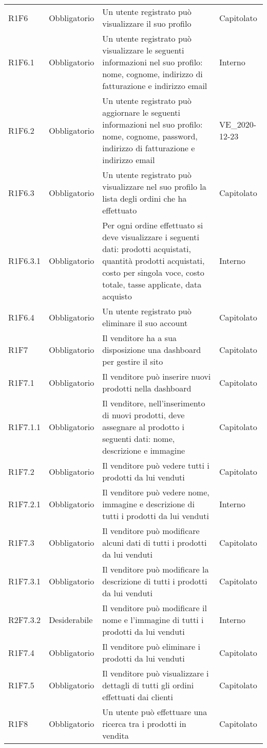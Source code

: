 {\begin{longtable}{C{2.5cm} C{2.8cm} C{6.7cm} C{2.5cm}}
R1F6 & Obbligatorio & Un utente registrato può visualizzare il suo profilo & Capitolato \\
R1F6.1 & Obbligatorio & Un utente registrato può visualizzare le seguenti informazioni nel suo profilo: nome, cognome, indirizzo di fatturazione e indirizzo email & Interno \\
R1F6.2 & Obbligatorio & Un utente registrato può aggiornare le seguenti informazioni nel suo profilo: nome, cognome, password, indirizzo di fatturazione e indirizzo email & VE\_2020-12-23 \\
R1F6.3 & Obbligatorio & Un utente registrato può visualizzare nel suo profilo la lista degli ordini che ha effettuato & Capitolato \\
R1F6.3.1 & Obbligatorio & Per ogni ordine effettuato si deve visualizzare i seguenti dati: prodotti acquistati, quantità prodotti acquistati, costo per singola voce, costo totale, tasse applicate, data acquisto & Interno \\
R1F6.4 & Obbligatorio & Un utente registrato può eliminare il suo account & Capitolato \\


R1F7 & Obbligatorio & Il venditore ha a sua disposizione una dashboard per gestire il sito & Capitolato \\
R1F7.1 & Obbligatorio & Il venditore può inserire nuovi prodotti nella dashboard & Capitolato \\
R1F7.1.1 & Obbligatorio & Il venditore, nell'inserimento di nuovi prodotti, deve assegnare al prodotto i seguenti dati: nome, descrizione e immagine & Capitolato \\
R1F7.2 & Obbligatorio & Il venditore può vedere tutti i prodotti da lui venduti & Capitolato \\
R1F7.2.1 & Obbligatorio & Il venditore può vedere nome, immagine e descrizione di tutti i prodotti da lui venduti & Interno \\
R1F7.3 & Obbligatorio & Il venditore può modificare alcuni dati di tutti i prodotti da lui venduti & Capitolato \\
R1F7.3.1 & Obbligatorio & Il venditore può modificare la descrizione di tutti i prodotti da lui venduti & Capitolato \\
R2F7.3.2 & Desiderabile & Il venditore può modificare il nome e l'immagine di tutti i prodotti da lui venduti & Interno \\
R1F7.4 & Obbligatorio & Il venditore può eliminare i prodotti da lui venduti & Capitolato \\
R1F7.5 & Obbligatorio & Il venditore può visualizzare i dettagli di tutti gli ordini effettuati dai clienti & Capitolato \\


R1F8 & Obbligatorio & Un utente può effettuare una ricerca tra i prodotti in vendita & Capitolato \\






\end{longtable}

}